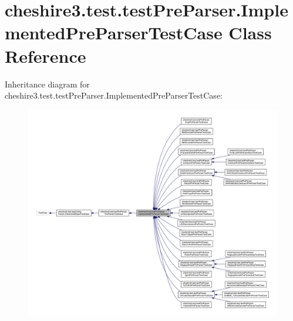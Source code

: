 \hypertarget{classcheshire3_1_1test_1_1test_pre_parser_1_1_implemented_pre_parser_test_case}{\section{cheshire3.\-test.\-test\-Pre\-Parser.\-Implemented\-Pre\-Parser\-Test\-Case Class Reference}
\label{classcheshire3_1_1test_1_1test_pre_parser_1_1_implemented_pre_parser_test_case}
}


Inheritance diagram for cheshire3.\-test.\-test\-Pre\-Parser.\-Implemented\-Pre\-Parser\-Test\-Case\-:
\nopagebreak
\begin{figure}[H]
\begin{center}
\leavevmode
\includegraphics[width=350pt]{classcheshire3_1_1test_1_1test_pre_parser_1_1_implemented_pre_parser_test_case__inherit__graph}
\end{center}
\end{figure}


